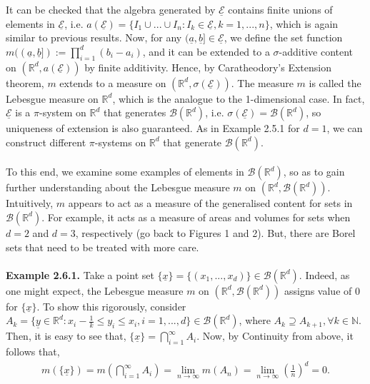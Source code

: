 \documentclass{article}
\begin{document}
It can be checked that the algebra generated by $\underline{\mathcal{E}}$ contains finite unions of elements in $\underline{\mathcal{E}}$, i.e. $a(\underline{\mathcal{E}}) = \{I_1 \cup ... \cup I_n: I_k \in \underline{\mathcal{E}}, k = 1, ..., n\}$, which is again similar to previous results. Now, for any $(\underline{a},\underline{b}] \in \underline{\mathcal{E}}$, we define the set function $m((\underline{a},\underline{b}]) := \prod_{i=1}^{d}(b_i - a_i)$, and it can be extended to a $\sigma$-additive content on $(\mathbb{R}^d, a(\underline{\mathcal{E}}))$ by finite additivity. Hence, by Caratheodory's Extension theorem, $m$ extends to a measure on $(\mathbb{R}^d, \sigma(\underline{\mathcal{E}}))$. The measure $m$ is called the Lebesgue measure on $\mathbb{R}^d$, which is the analogue to the 1-dimensional case. In fact, $\underline{\mathcal{E}}$ is a $\pi$-system on $\mathbb{R}^d$ that generates $\mathcal{B}(\mathbb{R}^d)$, i.e. $\sigma(\underline{\mathcal{E}}) = \mathcal{B}(\mathbb{R}^d)$, so uniqueness of extension is also guaranteed. As in Example 2.5.1 for $d=1$, we can construct different $\pi$-systems on $\mathbb{R}^d$ that generate $\mathcal{B}(\mathbb{R}^d)$.\\\\
To this end, we examine some examples of elements in $\mathcal{B}(\mathbb{R}^d)$, so as to gain further understanding about the Lebesgue measure $m$ on $(\mathbb{R}^d, \mathcal{B}(\mathbb{R}^d))$. Intuitively, $m$ appears to act as a measure of the generalised content for sets in $\mathcal{B}(\mathbb{R}^d)$. For example, it acts as a measure of areas and volumes for sets when $d=2$ and $d=3$, respectively (go back to Figures 1 and 2). But, there are Borel sets that need to be treated with more care.\\\\
\textbf{Example 2.6.1.} Take a point set $\{\underline{x}\} = \{(x_1,...,x_d)\} \in \mathcal{B}(\mathbb{R}^d)$. Indeed, as one might expect, the Lebesgue measure $m$ on $(\mathbb{R}^d, \mathcal{B}(\mathbb{R}^d))$ assigns value of $0$ for $\{\underline{x}\}$. To show this rigorously, consider $A_k = \{\underline{y} \in \mathbb{R}^d: x_i - \frac{1}{k} \leq y_i \leq x_i, i = 1,...,d\} \in \mathcal{B}(\mathbb{R}^d)$, where $A_k \supseteq A_{k+1}, \forall k \in \mathbb{N}$. Then, it is easy to see that, $\{\underline{x}\} = \bigcap_{i=1}^{\infty}A_i$. Now, by Continuity from above, it follows that,
\begin{eqnarray}
\nonumber
m(\{\underline{x}\}) = m\left(\bigcap_{i=1}^{\infty}A_i\right) = \lim_{n \to \infty}m(A_n) = \lim_{n \to \infty}\left(\frac{1}{n}\right)^d = 0.
\end{eqnarray}
\end{document}
